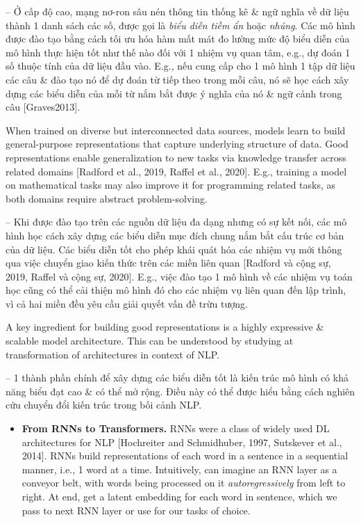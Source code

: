 \documentclass{article}
\begin{document}
\begin{itemize}
    -- Ở cấp độ cao, mạng nơ-ron sâu nén thông tin thống kê \& ngữ nghĩa về dữ liệu thành 1 danh sách các số, được gọi là {\it biểu diễn tiềm ẩn} hoặc {\it nhúng}. Các mô hình được đào tạo bằng cách tối ưu hóa hàm mất mát đo lường mức độ biểu diễn của mô hình thực hiện tốt như thế nào đối với 1 nhiệm vụ quan tâm, e.g., dự đoán 1 số thuộc tính của dữ liệu đầu vào. E.g., nếu cung cấp cho 1 mô hình 1 tập dữ liệu các câu \& đào tạo nó để dự đoán từ tiếp theo trong mỗi câu, nó sẽ học cách xây dựng các biểu diễn của mỗi từ nắm bắt được ý nghĩa của nó \& ngữ cảnh trong câu [Graves2013].

    When trained on diverse but interconnected data sources, models learn to build general-purpose representations that capture underlying structure of data. Good representations enable generalization to new tasks via knowledge transfer across related domains [Radford et al., 2019, Raffel et al., 2020]. E.g., training a model on mathematical tasks may also improve it for programming related tasks, as both domains require abstract problem-solving.

    -- Khi được đào tạo trên các nguồn dữ liệu đa dạng nhưng có sự kết nối, các mô hình học cách xây dựng các biểu diễn mục đích chung nắm bắt cấu trúc cơ bản của dữ liệu. Các biểu diễn tốt cho phép khái quát hóa các nhiệm vụ mới thông qua việc chuyển giao kiến thức trên các miền liên quan [Radford và cộng sự, 2019, Raffel và cộng sự, 2020]. E.g., việc đào tạo 1 mô hình về các nhiệm vụ toán học cũng có thể cải thiện mô hình đó cho các nhiệm vụ liên quan đến lập trình, vì cả hai miền đều yêu cầu giải quyết vấn đề trừu tượng.

    A key ingredient for building good representations is a highly expressive \& scalable model architecture. This can be understood by studying at transformation of architectures in context of NLP.

    -- 1 thành phần chính để xây dựng các biểu diễn tốt là kiến trúc mô hình có khả năng biểu đạt cao \& có thể mở rộng. Điều này có thể được hiểu bằng cách nghiên cứu chuyển đổi kiến trúc trong bối cảnh NLP.
    \begin{itemize}
        \item {\bf From RNNs to Transformers.} RNNs were a class of widely used DL architectures for NLP [Hochreiter and Schmidhuber, 1997, Sutskever et al., 2014]. RNNs build representations of each word in a sentence in a sequential manner, i.e., 1 word at a time. Intuitively, can imagine an RNN layer as a conveyor belt, with words being processed on it {\it autoregressively} from left to right. At end, get a latent embedding for each word in sentence, which we pass to next RNN layer or use for our tasks of choice.


\end{itemize}
\end{itemize}
\end{document}
